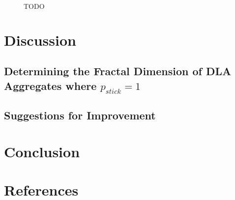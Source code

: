 \documentclass[11pt]{iopart}
\begin{document}
\begin{figure}[t]
        \quad
    \caption{TODO}
    \label{fig:meanFieldResults}
\end{figure}

\section{Discussion}
\subsection{Determining the Fractal Dimension of DLA Aggregates where $p_{stick} = 1$}
\subsection{Suggestions for Improvement}

\section{Conclusion}

\section*{References}


\end{document}
